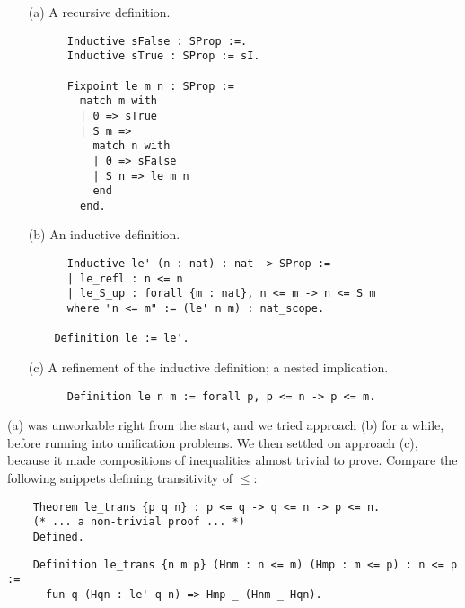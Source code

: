 \documentclass[10pt]{amsart}
\theoremstyle{definition}
\numberwithin{definition}{subsection}
\numberwithin{definition}{section}
\begin{document}
\begin{enumerate}
  \item[(a)] A recursive definition.
    \begin{listing}[H]
      \begin{verbatim}
      Inductive sFalse : SProp :=.
      Inductive sTrue : SProp := sI.

      Fixpoint le m n : SProp :=
        match m with
        | 0 => sTrue
        | S m =>
          match n with
          | 0 => sFalse
          | S n => le m n
          end
        end.
     \end{verbatim}
    \end{listing}
  \item[(b)] An inductive definition.
    \begin{listing}[H]
      \begin{verbatim}
      Inductive le' (n : nat) : nat -> SProp :=
      | le_refl : n <= n
      | le_S_up : forall {m : nat}, n <= m -> n <= S m
      where "n <= m" := (le' n m) : nat_scope.

    Definition le := le'.
    \end{verbatim}
    \end{listing}
  \item[(c)] A refinement of the inductive definition; a nested implication.
    \begin{listing}[H]
      \begin{verbatim}
      Definition le n m := forall p, p <= n -> p <= m.
      \end{verbatim}
    \end{listing}
\end{enumerate}

(a) was unworkable right from the start, and we tried approach (b) for a while, before running into unification problems. We then settled on approach (c), because it made compositions of inequalities almost trivial to prove. Compare the following snippets defining transitivity of $\leq$:

\begin{listing}[H]
  \begin{verbatim}
    Theorem le_trans {p q n} : p <= q -> q <= n -> p <= n.
    (* ... a non-trivial proof ... *)
    Defined.
  \end{verbatim}
  \caption{\texttt{le_trans} when $\leq$ is defined using an inductive approach}
\end{listing}

\begin{listing}[H]
  \begin{verbatim}
    Definition le_trans {n m p} (Hnm : n <= m) (Hmp : m <= p) : n <= p :=
      fun q (Hqn : le' q n) => Hmp _ (Hnm _ Hqn).
  \end{verbatim}
  \caption{\texttt{le_trans} when $\leq$ is defined using a nested implication}
\end{listing}
\end{document}
